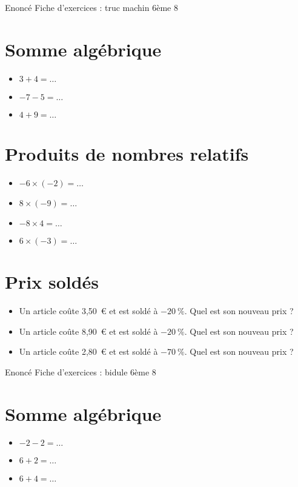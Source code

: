 \documentclass[a4paper,11pt,fleqn]{article}
\begin{document}
\pagestyle{empty}


{Enoncé} \hfill {\huge Fiche d'exercices  : truc machin} \hfill {6ème 8}

\section{Somme algébrique}
\begin{itemize}

  \item $3 +4=\ldots$
  \item $-7 -5=\ldots$
  \item $4 +9=\ldots$
\end{itemize}


\section{Produits de nombres relatifs}
\begin{itemize}

  \item $-6\times(-2)=\ldots$
  \item $8\times(-9)=\ldots$
  \item $-8\times4=\ldots$
  \item $6\times(-3)=\ldots$
\end{itemize}


\section{Prix soldés}
\begin{itemize}

  \item Un article coûte 3,50~€ et est soldé à $-20~\%$. Quel est son nouveau prix ?
  \item Un article coûte 8,90~€ et est soldé à $-20~\%$. Quel est son nouveau prix ?
  \item Un article coûte 2,80~€ et est soldé à $-70~\%$. Quel est son nouveau prix ?
\end{itemize}
\newpage
\setcounter{exo}{0}
\setcounter{section}{0}
{Enoncé} \hfill {\huge Fiche d'exercices  : bidule} \hfill {6ème 8}

\section{Somme algébrique}
\begin{itemize}

  \item $-2 -2=\ldots$
  \item $6 +2=\ldots$
  \item $6 +4=\ldots$
\end{itemize}
\end{document}

